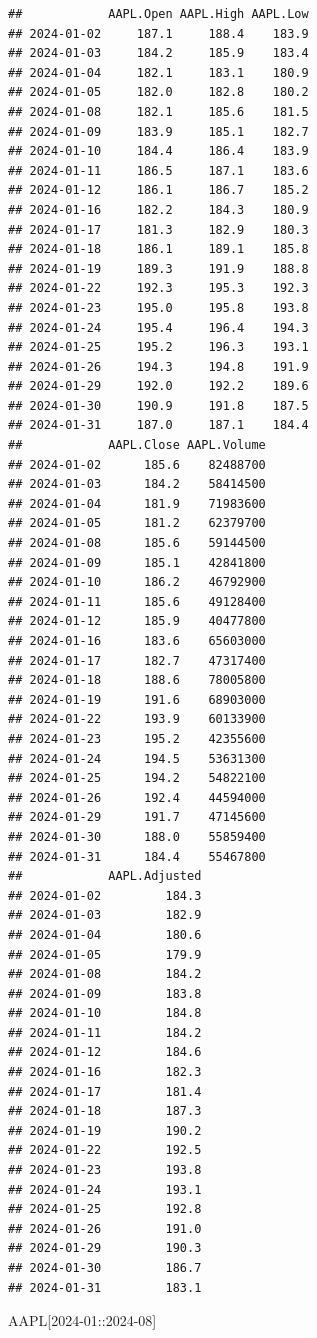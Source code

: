 \documentclass[]{ctexbook}
\newenvironment{Shaded}{\begin{snugshade}}{\end{snugshade}}
\newcommand{\NormalTok}[1]{#1}
\newcommand{\StringTok}[1]{\textcolor[rgb]{0.31,0.60,0.02}{#1}}
\begin{document}
\begin{verbatim}
##            AAPL.Open AAPL.High AAPL.Low
## 2024-01-02     187.1     188.4    183.9
## 2024-01-03     184.2     185.9    183.4
## 2024-01-04     182.1     183.1    180.9
## 2024-01-05     182.0     182.8    180.2
## 2024-01-08     182.1     185.6    181.5
## 2024-01-09     183.9     185.1    182.7
## 2024-01-10     184.4     186.4    183.9
## 2024-01-11     186.5     187.1    183.6
## 2024-01-12     186.1     186.7    185.2
## 2024-01-16     182.2     184.3    180.9
## 2024-01-17     181.3     182.9    180.3
## 2024-01-18     186.1     189.1    185.8
## 2024-01-19     189.3     191.9    188.8
## 2024-01-22     192.3     195.3    192.3
## 2024-01-23     195.0     195.8    193.8
## 2024-01-24     195.4     196.4    194.3
## 2024-01-25     195.2     196.3    193.1
## 2024-01-26     194.3     194.8    191.9
## 2024-01-29     192.0     192.2    189.6
## 2024-01-30     190.9     191.8    187.5
## 2024-01-31     187.0     187.1    184.4
##            AAPL.Close AAPL.Volume
## 2024-01-02      185.6    82488700
## 2024-01-03      184.2    58414500
## 2024-01-04      181.9    71983600
## 2024-01-05      181.2    62379700
## 2024-01-08      185.6    59144500
## 2024-01-09      185.1    42841800
## 2024-01-10      186.2    46792900
## 2024-01-11      185.6    49128400
## 2024-01-12      185.9    40477800
## 2024-01-16      183.6    65603000
## 2024-01-17      182.7    47317400
## 2024-01-18      188.6    78005800
## 2024-01-19      191.6    68903000
## 2024-01-22      193.9    60133900
## 2024-01-23      195.2    42355600
## 2024-01-24      194.5    53631300
## 2024-01-25      194.2    54822100
## 2024-01-26      192.4    44594000
## 2024-01-29      191.7    47145600
## 2024-01-30      188.0    55859400
## 2024-01-31      184.4    55467800
##            AAPL.Adjusted
## 2024-01-02         184.3
## 2024-01-03         182.9
## 2024-01-04         180.6
## 2024-01-05         179.9
## 2024-01-08         184.2
## 2024-01-09         183.8
## 2024-01-10         184.8
## 2024-01-11         184.2
## 2024-01-12         184.6
## 2024-01-16         182.3
## 2024-01-17         181.4
## 2024-01-18         187.3
## 2024-01-19         190.2
## 2024-01-22         192.5
## 2024-01-23         193.8
## 2024-01-24         193.1
## 2024-01-25         192.8
## 2024-01-26         191.0
## 2024-01-29         190.3
## 2024-01-30         186.7
## 2024-01-31         183.1
\end{verbatim}

\begin{Shaded}
\begin{Highlighting}[]
\NormalTok{AAPL[}\StringTok{\textquotesingle{}2024{-}01::2024{-}08\textquotesingle{}}\NormalTok{]}
\end{Highlighting}
\end{Shaded}
\end{document}
